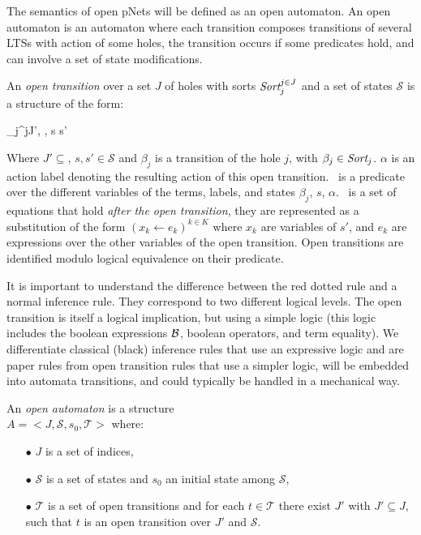 \documentclass{lncs/llncs}
\newcommand{\TODO}[1]{\textcolor{red}{\textbf{[TODO:#1]}}}
\begin{document}
The semantics of open pNets will be defined  as an open automaton. An open
automaton is an automaton where each transition composes transitions of several LTSs with
action of some holes, the transition occurs if some predicates hold, and can involve a 
set of state modifications.
\begin{definition}\label{def:OT}
	\label{def:OpenTransitions}
	An \emph{open transition} over a
	set $J$ of holes with sorts $\Sort_j^{j\in J}$ and a set of states $\mathcal{S}$ is 
	a structure of the form:	
	\begin{mathpar}
	\openrule
	{	\beta_j^{j\in J'}, \Pred, \Post}
	{s \OTarrow {\alpha}s'}
	\end{mathpar}
	Where $J'\subseteq$, $s, s'\in\mathcal{S}$ and $\beta_j$
        is a transition of the hole $j$, with $\beta_j\in\Sort_j$. $\alpha$ is an action 
        label denoting the resulting action
        of this open transition. \Pred\ is a predicate 
	over the different variables of the
	terms, labels, and states $\beta_j$, $s$, $\alpha$. \Post\ is a set of 
	equations 
	that 
	hold \emph{after the open transition}, they are represented as a substitution of the 
	form $({x_k\gets e_k})^{k\in K}$ 
	where $x_k$ are variables of $s'$, and $e_k$ are expressions over the other 
	variables of the open transition. Open transitions are identified modulo logical equivalence on their predicate.
\end{definition}

It is important to understand the difference between the red dotted rule and a normal 
inference rule. They correspond to two different logical levels.
 The open transition is itself a logical implication, but using a simple logic (this logic includes the boolean expressions $\mathcal{B}$, boolean operators, and term equality). We differentiate classical (black) inference rules that use 
 an expressive logic and are paper rules from open transition rules that use a simpler 
 logic, 
 will be embedded into automata transitions, and could typically be handled in a 
 mechanical way.

\begin{definition}
	\label{def:open-automaton}
	An \emph{open automaton} is a structure\\ $A =
	<J,\mathcal{S},s_0,\mathcal{T}>$ where:
	\begin{itemize}
		\item[$\bullet$]   $J$ is a  set of indices,
		\item[$\bullet$]   $\mathcal{S}$ is a set of states and $s_0$ an initial state
		among $\mathcal{S}$,
		\item[$\bullet$] $\mathcal{T}$ is a set of open transitions and for each
		$t\in \mathcal{T}$ there exist  $J'$ with  $J'
		\subseteq J$, such that $t$ is an open transition over  $J'$
		and  $\mathcal{S}$.
		
	\end{itemize}
\end{definition}
	
\end{document}
